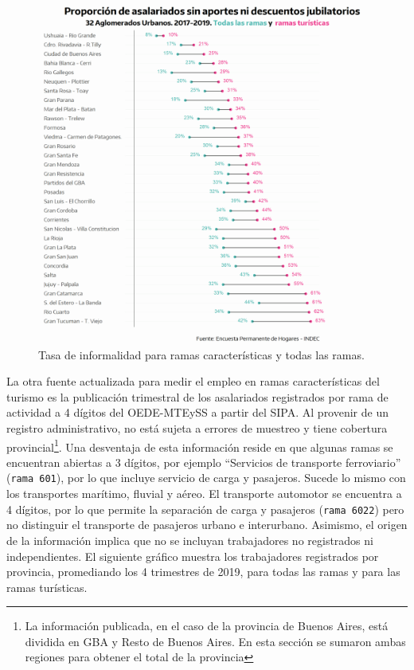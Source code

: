\documentclass[
  openany]{book}
\begin{document}
\begin{figure}

{\centering \includegraphics[width=1\linewidth]{imagenes/empleo eph} 

}

\caption{Tasa de informalidad para ramas características y todas las ramas.}\label{fig:empleoeph}
\end{figure}

La otra fuente actualizada para medir el empleo en ramas características del turismo es la publicación trimestral de los asalariados registrados por rama de actividad a 4 dígitos del OEDE-MTEySS a partir del SIPA. Al provenir de un registro administrativo, no está sujeta a errores de muestreo y tiene cobertura provincial\footnote{La información publicada, en el caso de la provincia de Buenos Aires, está dividida en GBA y Resto de Buenos Aires. En esta sección se sumaron ambas regiones para obtener el total de la provincia}. Una desventaja de esta información reside en que algunas ramas se encuentran abiertas a 3 dígitos, por ejemplo ``Servicios de transporte ferroviario'' (\texttt{rama\ 601}), por lo que incluye servicio de carga y pasajeros. Sucede lo mismo con los transportes marítimo, fluvial y aéreo. El transporte automotor se encuentra a 4 dígitos, por lo que permite la separación de carga y pasajeros (\texttt{rama\ 6022}) pero no distinguir el transporte de pasajeros urbano e interurbano.
Asimismo, el origen de la información implica que no se incluyan trabajadores no registrados ni independientes. El siguiente gráfico muestra los trabajadores registrados por provincia, promediando los 4 trimestres de 2019, para todas las ramas y para las ramas turísticas.
\end{document}
